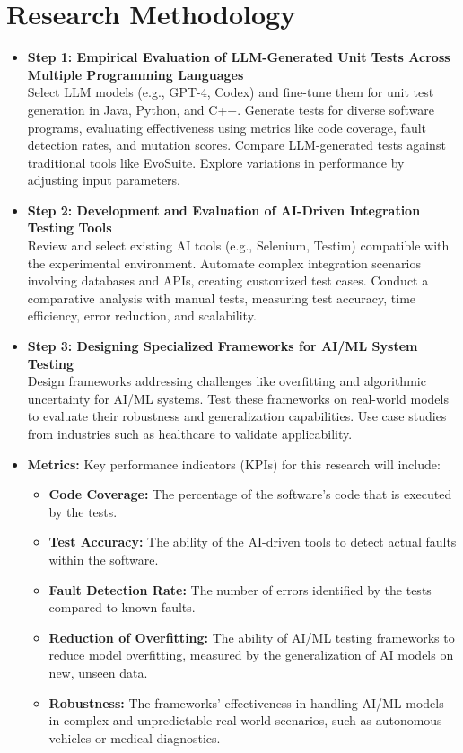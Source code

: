 \documentclass[12pt,a4paper]{article}
\begin{document}
\section{Research Methodology}
\begin{itemize}
    \item \textbf{Step 1: Empirical Evaluation of LLM-Generated Unit Tests Across Multiple Programming Languages}\\
    Select LLM models (e.g., GPT-4, Codex) and fine-tune them for unit test generation in Java, Python, and C++. Generate tests for diverse software programs, evaluating effectiveness using metrics like code coverage, fault detection rates, and mutation scores. Compare LLM-generated tests against traditional tools like EvoSuite. Explore variations in performance by adjusting input parameters.
    
    \item \textbf{Step 2: Development and Evaluation of AI-Driven Integration Testing Tools} \\
    Review and select existing AI tools (e.g., Selenium, Testim) compatible with the experimental environment. Automate complex integration scenarios involving databases and APIs, creating customized test cases. Conduct a comparative analysis with manual tests, measuring test accuracy, time efficiency, error reduction, and scalability.
    
    \item \textbf{Step 3: Designing Specialized Frameworks for AI/ML System Testing}\\
    Design frameworks addressing challenges like overfitting and algorithmic uncertainty for AI/ML systems. Test these frameworks on real-world models to evaluate their robustness and generalization capabilities. Use case studies from industries such as healthcare to validate applicability.

    \item \textbf{Metrics:} Key performance indicators (KPIs) for this research will include:
    \begin{itemize}
    \item \textbf{Code Coverage:} The percentage of the software's code that is executed by the tests.

    \item \textbf{Test Accuracy:} The ability of the AI-driven tools to detect actual faults within the software.

    \item \textbf{Fault Detection Rate:} The number of errors identified by the tests compared to known faults.

    \item \textbf{Reduction of Overfitting:} The ability of AI/ML testing frameworks to reduce model overfitting, measured by the generalization of AI models on new, unseen data.

    \item \textbf{Robustness:} The frameworks’ effectiveness in handling AI/ML models in complex and unpredictable real-world scenarios, such as autonomous vehicles or medical diagnostics.
    \end{itemize}

\end{itemize}
\end{document}

